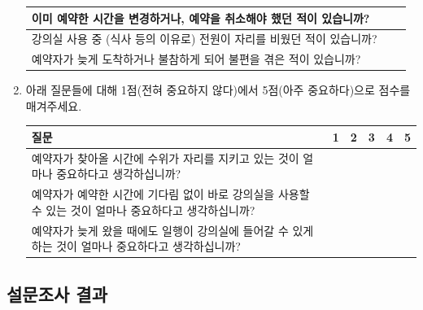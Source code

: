 \documentclass[11pt,a4paper]{article}
\begin{document}
\begin{enumerate}
\begin{tabular}{ | l | c | c | }
\hline
이미 예약한 시간을 변경하거나, 예약을 취소해야 했던 적이 있습니까? & & \\
\hline
강의실 사용 중 (식사 등의 이유로) 전원이 자리를 비웠던 적이 있습니까? & & \\
\hline
예약자가 늦게 도착하거나 불참하게 되어 불편을 겪은 적이 있습니까? & & \\
\hline
\end{tabular}
\item 아래 질문들에 대해 1점(전혀 중요하지 않다)에서 5점(아주 중요하다)으로 점수를 매겨주세요.\\
\begin{tabular}{ | p{12cm} | c | c | c | c | c | }
\hline
질문 & 1 & 2 & 3 & 4 & 5 \\
\hline
예약자가 찾아올 시간에 수위가 자리를 지키고 있는 것이 얼마나 중요하다고 생각하십니까? & & & & & \\
\hline
예약자가 예약한 시간에 기다림 없이 바로 강의실을 사용할 수 있는 것이 얼마나 중요하다고 생각하십니까? & & & & & \\
\hline
예약자가 늦게 왔을 때에도 일행이 강의실에 들어갈 수 있게 하는 것이 얼마나 중요하다고 생각하십니까? & & & & & \\
\hline
\end{tabular}
\end{enumerate}
\subsection{설문조사 결과}
\end{document}
